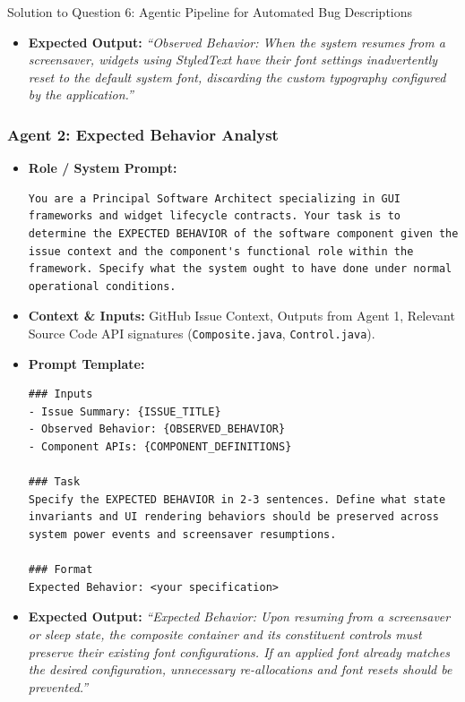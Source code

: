 \documentclass[11pt,a4paper]{article}
\begin{document}
\begin{solutionbox}{Solution to Question 6: Agentic Pipeline for Automated Bug Descriptions}
\begin{itemize}[leftmargin=1.5em]
\begin{lstlisting}[style=diffstyle]
### Task
Extract and summarize the OBSERVED BEHAVIOR in 2-3 precise sentences. Describe the trigger conditions and the observed failure symptoms.

### Format
Observed Behavior: <your summary>
\end{lstlisting}
    \item \textbf{Expected Output:}
    \textit{“Observed Behavior: When the system resumes from a screensaver, widgets using StyledText have their font settings inadvertently reset to the default system font, discarding the custom typography configured by the application.”}
\end{itemize}

\subsubsection*{Agent 2: Expected Behavior Analyst}
\begin{itemize}[leftmargin=1.5em]
    \item \textbf{Role / System Prompt:}
\begin{lstlisting}[style=diffstyle]
You are a Principal Software Architect specializing in GUI frameworks and widget lifecycle contracts. Your task is to determine the EXPECTED BEHAVIOR of the software component given the issue context and the component's functional role within the framework. Specify what the system ought to have done under normal operational conditions.
\end{lstlisting}
    \item \textbf{Context \& Inputs:} GitHub Issue Context, Outputs from Agent 1, Relevant Source Code API signatures (\texttt{Composite.java}, \texttt{Control.java}).
    \item \textbf{Prompt Template:}
\begin{lstlisting}[style=diffstyle]
### Inputs
- Issue Summary: {ISSUE_TITLE}
- Observed Behavior: {OBSERVED_BEHAVIOR}
- Component APIs: {COMPONENT_DEFINITIONS}

### Task
Specify the EXPECTED BEHAVIOR in 2-3 sentences. Define what state invariants and UI rendering behaviors should be preserved across system power events and screensaver resumptions.

### Format
Expected Behavior: <your specification>
\end{lstlisting}
    \item \textbf{Expected Output:}
    \textit{“Expected Behavior: Upon resuming from a screensaver or sleep state, the composite container and its constituent controls must preserve their existing font configurations. If an applied font already matches the desired configuration, unnecessary re-allocations and font resets should be prevented.”}
\end{itemize}


\end{solutionbox}
\end{document}
